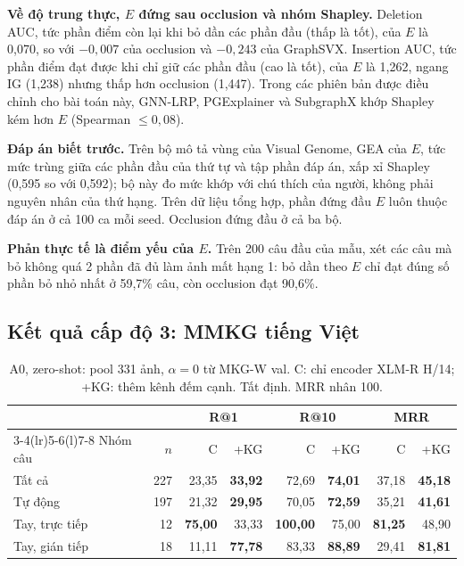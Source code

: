 \textbf{Về độ trung thực, $E$ đứng sau occlusion và nhóm Shapley.} Deletion AUC, tức phần điểm còn lại khi bỏ dần các phần
đầu (thấp là tốt), của $E$ là 0,070, so với $-0{,}007$ của occlusion và $-0{,}243$ của GraphSVX. Insertion AUC, tức phần
điểm đạt được khi chỉ giữ các phần đầu (cao là tốt), của $E$ là 1,262, ngang IG (1,238) nhưng thấp hơn occlusion (1,447).
Trong các phiên bản được điều chỉnh cho bài toán này, GNN-LRP, PGExplainer và SubgraphX khớp Shapley kém hơn $E$ (Spearman
$\le 0{,}08$).

\textbf{Đáp án biết trước.} Trên bộ mô tả vùng của Visual Genome, GEA của $E$, tức mức trùng giữa các phần đầu của thứ tự và
tập phần đáp án, xấp xỉ Shapley (0,595 so với 0,592); bộ này đo mức khớp với chú thích của người, không phải nguyên nhân của
thứ hạng. Trên dữ liệu tổng hợp, phần đứng đầu $E$ luôn thuộc đáp án ở cả 100 ca mỗi seed. Occlusion đứng đầu ở cả ba bộ.

\textbf{Phản thực tế là điểm yếu của $E$.} Trên 200 câu đầu của mẫu, xét các câu mà bỏ không quá 2 phần đã đủ làm ảnh mất
hạng 1: bỏ dần theo $E$ chỉ đạt đúng số phần bỏ nhỏ nhất ở 59,7\% câu, còn occlusion đạt 90,6\%.

\subsection{Kết quả cấp độ 3: MMKG tiếng Việt}
\label{sec:vnmmkg}

\begin{table}[t]
\centering
\caption{A0, zero-shot: pool 331 ảnh, $\alpha=0$ từ MKG-W val. C: chỉ encoder XLM-R H/14; +KG: thêm kênh đếm
cạnh. Tất định. MRR nhân 100.}
\label{tab:vn-a0}
\footnotesize
\setlength{\tabcolsep}{2.5pt}
\begin{tabular}{@{}lrrrrrrr@{}}
\toprule
 & & \multicolumn{2}{c}{R@1} & \multicolumn{2}{c}{R@10} & \multicolumn{2}{c}{MRR} \\
\cmidrule(lr){3-4}\cmidrule(lr){5-6}\cmidrule(l){7-8}
Nhóm câu & $n$ & C & +KG & C & +KG & C & +KG \\
\midrule
Tất cả & 227 & 23,35 & \textbf{33,92} & 72,69 & \textbf{74,01} & 37,18 & \textbf{45,18} \\
Tự động & 197 & 21,32 & \textbf{29,95} & 70,05 & \textbf{72,59} & 35,21 & \textbf{41,61} \\
Tay, trực tiếp & 12 & \textbf{75,00} & 33,33 & \textbf{100,00} & 75,00 & \textbf{81,25} & 48,90 \\
Tay, gián tiếp & 18 & 11,11 & \textbf{77,78} & 83,33 & \textbf{88,89} & 29,41 & \textbf{81,81} \\
\bottomrule
\end{tabular}
\end{table}

